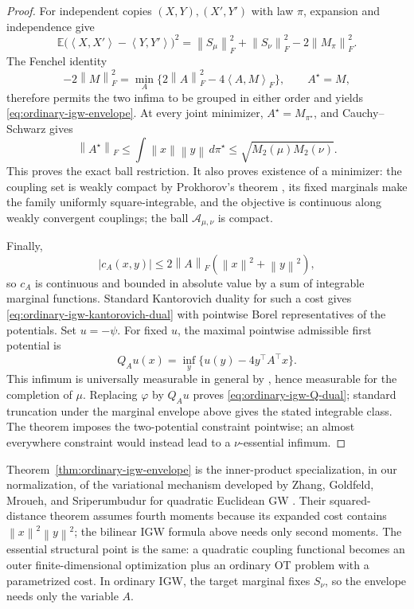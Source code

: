\documentclass[11pt]{article}
\newcommand{\E}{\mathbb E}
\newcommand{\ip}[2]{\left\langle #1,#2\right\rangle}
\newcommand{\norm}[1]{\left\lVert #1\right\rVert}
\theoremstyle{plain}
\theoremstyle{definition}
\theoremstyle{remark}
\begin{document}
\begin{proof}
For independent copies $(X,Y),(X',Y')$ with law $\pi$, expansion and independence
give
\[
 \E\big(\ip{X}{X'}-\ip{Y}{Y'}\big)^2
 =\norm{S_\mu}_F^2+\norm{S_\nu}_F^2-2\norm{M_\pi}_F^2.
\]
The Fenchel identity
\[
 -2\norm M_F^2
 =\min_A\{2\norm A_F^2-4\ip{A}{M}_F\},
 \qquad A^\star=M,
\]
therefore permits the two infima to be grouped in either order and yields
\eqref{eq:ordinary-igw-envelope}. At every joint minimizer,
$A^\star=M_{\pi^\star}$, and Cauchy--Schwarz gives
\[
 \norm{A^\star}_F
 \le\int\norm x\norm y\,d\pi^\star
 \le\sqrt{M_2(\mu)M_2(\nu)}.
\]
This proves the exact ball restriction. It also proves existence of a minimizer: the coupling set
is weakly compact by Prokhorov's theorem \cite[Theorem~5.1]{Billingsley}, its fixed
marginals make the family uniformly square-integrable,
and the objective is continuous along weakly convergent couplings; the ball
$\mathcal A_{\mu,\nu}$ is compact.

Finally,
\[
 |c_A(x,y)|\le
 2\norm A_F(\norm x^2+\norm y^2),
\]
so $c_A$ is continuous and bounded in absolute value by a sum of integrable
marginal functions. Standard Kantorovich duality for such a cost
\cite[Theorem~5.10]{VillaniOT} gives
\eqref{eq:ordinary-igw-kantorovich-dual} with pointwise Borel representatives of
the potentials. Set $u=-\psi$. For fixed $u$, the maximal pointwise admissible
first potential is
\[
 Q_Au(x)=\inf_y\{u(y)-4y^\top A^\top x\}.
\]
This infimum is universally measurable in general by
\cite[Proposition~7.47]{BertsekasShreve}, hence measurable for the completion of
$\mu$. Replacing $\varphi$ by $Q_Au$ proves
\eqref{eq:ordinary-igw-Q-dual}; standard truncation under the marginal envelope
above gives the stated integrable class. The theorem imposes the two-potential
constraint pointwise; an almost everywhere constraint would instead lead to a
$\nu$-essential infimum.
\end{proof}

Theorem~\ref{thm:ordinary-igw-envelope} is the inner-product specialization, in
our normalization, of the variational mechanism developed by Zhang, Goldfeld,
Mroueh, and Sriperumbudur for quadratic Euclidean GW
\cite{ZhangGoldfeldMrouehSriperumbudur}. Their squared-distance theorem assumes
fourth moments because its expanded cost contains $\norm x^2\norm y^2$; the
bilinear IGW formula above needs only second moments. The essential structural point
is the same: a quadratic coupling functional becomes an outer finite-dimensional
optimization plus an ordinary OT problem with a parametrized cost. In ordinary
IGW, the target marginal fixes $S_\nu$, so the envelope needs only the variable
$A$.
\end{document}
